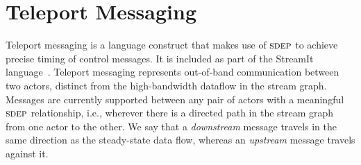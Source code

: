 \documentclass{sig-alternate}
\begin{document}
\section{Teleport Messaging}
\label{sec:teleport}


Teleport messaging is a language construct that makes use of $\textsc{sdep}$
to achieve precise timing of control messages.  It is included as part
of the StreamIt language~\cite{streamitcc}.  Teleport messaging
represents out-of-band communication between two actors, distinct from
the high-bandwidth dataflow in the stream graph.  Messages are
currently supported between any pair of actors with a meaningful
$\textsc{sdep}$ relationship, i.e., wherever there is a directed path in the
stream graph from one actor to the other.  We say that a {\it
downstream} message travels in the same direction as the steady-state
data flow, whereas an {\it upstream} message travels against it.
\end{document}
